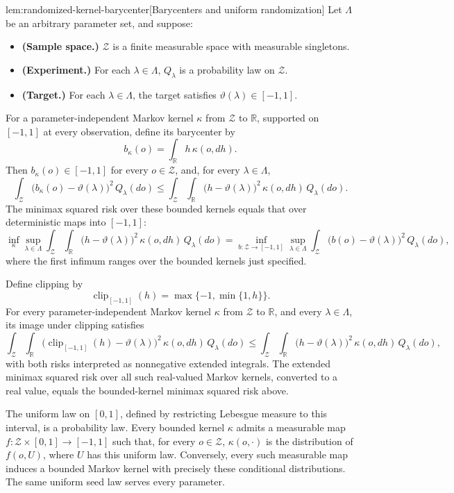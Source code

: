 \begin{lemmav}{lem:randomized-kernel-barycenter}[Barycenters and uniform randomization]
Let \(\Lambda\) be an arbitrary parameter set, and suppose:
\begin{itemize}
\item \textbf{(Sample space.)} \(\mathcal Z\) is a finite measurable space with measurable singletons.
\item \textbf{(Experiment.)} For each \(\lambda\in\Lambda\), \(Q_\lambda\) is a probability law on \(\mathcal Z\).
\item \textbf{(Target.)} For each \(\lambda\in\Lambda\), the target satisfies \(\vartheta(\lambda)\in[-1,1]\).
\end{itemize}
For a parameter-independent Markov kernel \(\kappa\) from \(\mathcal Z\) to \(\mathbb R\), supported on \([-1,1]\) at every observation, define its barycenter by
\[
b_\kappa(o)=\int_{\mathbb R}h\,\kappa(o,dh).
\]
Then \(b_\kappa(o)\in[-1,1]\) for every \(o\in\mathcal Z\), and, for every \(\lambda\in\Lambda\),
\[
\int_{\mathcal Z}\bigl(b_\kappa(o)-\vartheta(\lambda)\bigr)^2\,Q_\lambda(do)
\le
\int_{\mathcal Z}\int_{\mathbb R}
\bigl(h-\vartheta(\lambda)\bigr)^2\,\kappa(o,dh)\,Q_\lambda(do).
\]
The minimax squared risk over these bounded kernels equals that over deterministic maps into \([-1,1]\):
\[
\inf_{\kappa}\sup_{\lambda\in\Lambda}
\int_{\mathcal Z}\int_{\mathbb R}
\bigl(h-\vartheta(\lambda)\bigr)^2\,\kappa(o,dh)\,Q_\lambda(do)
=
\inf_{b:\mathcal Z\to[-1,1]}\sup_{\lambda\in\Lambda}
\int_{\mathcal Z}\bigl(b(o)-\vartheta(\lambda)\bigr)^2\,Q_\lambda(do),
\]
where the first infimum ranges over the bounded kernels just specified.

Define clipping by
\[
\operatorname{clip}_{[-1,1]}(h)=\max\{-1,\min\{1,h\}\}.
\]
For every parameter-independent Markov kernel \(\kappa\) from \(\mathcal Z\) to \(\mathbb R\), and every \(\lambda\in\Lambda\), its image under clipping satisfies
\[
\int_{\mathcal Z}\int_{\mathbb R}
\bigl(\operatorname{clip}_{[-1,1]}(h)-\vartheta(\lambda)\bigr)^2
\,\kappa(o,dh)\,Q_\lambda(do)
\le
\int_{\mathcal Z}\int_{\mathbb R}
\bigl(h-\vartheta(\lambda)\bigr)^2\,\kappa(o,dh)\,Q_\lambda(do),
\]
with both risks interpreted as nonnegative extended integrals. The extended minimax squared risk over all such real-valued Markov kernels, converted to a real value, equals the bounded-kernel minimax squared risk above.

The uniform law on \([0,1]\), defined by restricting Lebesgue measure to this interval, is a probability law. Every bounded kernel \(\kappa\) admits a measurable map
\(f:\mathcal Z\times[0,1]\to[-1,1]\) such that, for every \(o\in\mathcal Z\), \(\kappa(o,\cdot)\) is the distribution of \(f(o,U)\), where \(U\) has this uniform law. Conversely, every such measurable map induces a bounded Markov kernel with precisely these conditional distributions. The same uniform seed law serves every parameter.
\end{lemmav}

